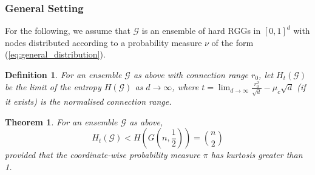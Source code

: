 \documentclass{article}
\newtheorem{definition}{Definition}
\newtheorem{theorem}{Theorem}
\newcommand{\tti}{\rightarrow\infty}
\newcommand{\graph}{\mathcal{G}}
\begin{document}
\subsubsection{General Setting}
For the following, we assume that $\mathcal{G}$ is an ensemble of hard RGGs in $[0,1]^d$ with nodes distributed according to a probability measure $\nu$ of the form (\ref{eq:general_distribution}).
\begin{definition}
    For an ensemble $\graph$ as above with connection range $r_0$, let $H_t(\graph)$ be the limit of the entropy $H(\graph)$ as $d\tti$, where $t = \lim_{d\tti} \frac{r_0^2}{\sqrt{d}} - \mu_c\sqrt{d}$ (if it exists) is the normalised connection range.
\end{definition}
\begin{theorem}
    \label{thm:hard_cube_entropy}
    For an ensemble $\graph$ as above,
    \begin{equation}
         H_t(\graph) < H\left(G\left(n,\frac{1}{2}\right)\right) = \binom{n}{2}
    \end{equation}
    provided that the coordinate-wise probability measure $\pi$ has kurtosis greater than 1.
\end{theorem}
\end{document}

